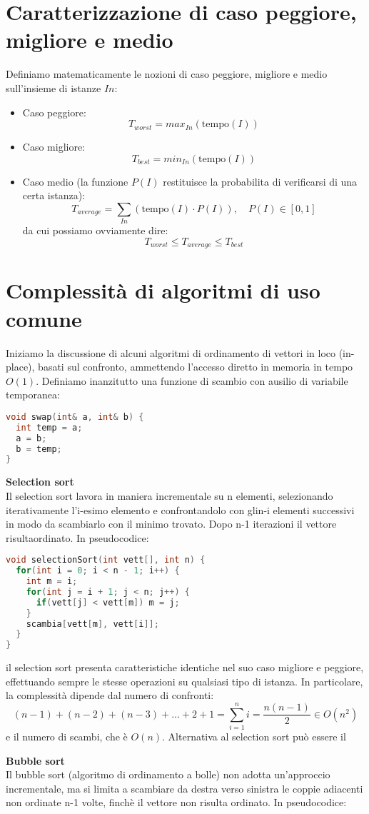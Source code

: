 \documentclass[a4paper,12pt]{article}
\begin{document}
\section{Caratterizzazione di caso peggiore, migliore e medio}
Definiamo matematicamente le nozioni di caso peggiore, migliore e medio sull'insieme di istanze $In$:
\begin{itemize}
  \item Caso peggiore:
    $$ T_{worst} = max_{In}(\mathrm{tempo}(I)) $$
  \item Caso migliore:
    $$ T_{best}  = min_{In}(\mathrm{tempo}(I)) $$
  \item Caso medio (la funzione $P(I)$ restituisce la probabilita di verificarsi di una certa istanza):
    $$ T_{average} = \sum_{In}(\mathrm{tempo}(I) \cdot P(I)), \quad P(I) \in [0, 1] $$
    da cui possiamo ovviamente dire:
    $$ T_{worst} \leq T_{average} \leq T_{best} $$
\end{itemize}

\section{Complessità di algoritmi di uso comune}
Iniziamo la discussione di alcuni algoritmi di ordinamento di vettori in loco (in-place), basati sul confronto,
ammettendo l'accesso diretto in memoria in tempo $O(1)$. Definiamo inanzitutto una funzione di scambio con
ausilio di variabile temporanea:
\begin{lstlisting}[language=C++]
void swap(int& a, int& b) {
  int temp = a;
  a = b;
  b = temp;
}
\end{lstlisting}
\par \medskip
\textbf{Selection sort} \\
Il selection sort lavora in maniera incrementale su n elementi, selezionando iterativamente l'i-esimo elemento
e confrontandolo con glin-i elementi successivi in modo da scambiarlo con il minimo trovato. Dopo n-1 
iterazioni il vettore risultaordinato. In pseudocodice:

\begin{lstlisting}[language=C++]
void selectionSort(int vett[], int n) {
  for(int i = 0; i < n - 1; i++) {
    int m = i;
    for(int j = i + 1; j < n; j++) {
      if(vett[j] < vett[m]) m = j;
    }
    scambia[vett[m], vett[i]];
  }
}
\end{lstlisting}

il selection sort presenta caratteristiche identiche nel suo caso migliore e peggiore, effettuando sempre le stesse
operazioni su qualsiasi tipo di istanza. In particolare, la complessità dipende dal numero di confronti:
$$ (n-1)+(n-2)+(n-3)+...+2+1 = \sum_{i=1}^{n} i = \frac{n(n-1)}{2} \in O(n^2) $$
e il numero di scambi, che è $O(n)$. Alternativa al selection sort può essere il
\par \medskip
\textbf{Bubble sort} \\
Il bubble sort (algoritmo di ordinamento a bolle) non adotta un'approccio incrementale, ma si limita a scambiare
da destra verso sinistra le coppie adiacenti non ordinate n-1 volte, finchè il vettore non risulta ordinato.
In pseudocodice:
\end{document}
